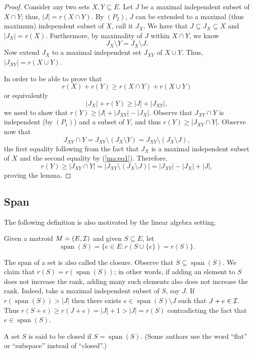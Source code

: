 \documentclass[12pt]{article}
\newcommand{\spa}{\operatorname{span}}
\begin{document}
\begin{proof}
Consider any two sets $X, Y\subseteq E$. Let $J$ be a maximal
independent subset of $X\cap Y$; thus, $|J|=r(X\cap Y)$. By $(P_2)$,
$J$ can be extended to a maximal (thus maximum) independent subset of
$X$, call it $J_X$. We have that $J\subseteq J_X \subseteq X$ and
$|J_X|=r(X)$. Furthermore, by maximality of $J$ within $X\cap Y$, we
know \begin{equation} \label{ma:eq1}
J_X \setminus Y = J_X \setminus J.
\end{equation}
 Now extend $J_X$ to a maximal independent set $J_{XY}$
of $X\cup Y$. Thus, $|J_{XY}|=r(X \cup Y)$. 

In order to be able to
prove that 
$$r(X)+r(Y)\geq r(X\cap Y) + r(X \cup Y)$$
or equivalently
$$|J_X|+r(Y) \geq |J|+|J_{XY}|,$$
we need to show that $r(Y)\geq |J|+|J_{XY}|-|J_X|$. Observe that
$J_{XY}\cap Y$ is independent (by $(P_1)$) and a subset of $Y$, and
thus $r(Y)\geq |J_{XY}\cap Y|$. Observe now 
that $$J_{XY}\cap Y = J_{XY}\setminus (J_X\setminus Y) =J_{XY}\setminus
(J_X\setminus J),$$
the first equality following from the fact that $J_X$ is a maximal
independent subset of $X$ and the second equality by
(\ref{ma:eq1}). Therefore, $$   r(Y)\geq |J_{XY}\cap Y| = |J_{XY}\setminus
(J_X\setminus J)|= |J_{XY}|-|J_X|+|J|,$$ proving the lemma.
\end{proof}

\subsection{Span}
The following definition is also motivated by the linear algebra
setting. 

\begin{definition} \label{def:span}
Given a matroid $M=(E, {\cal I})$ and given $S \subseteq E$,
let $$\spa(S)=\{e\in E: r(S\cup\{e\})=r(S)\}.$$
\end{definition}
The span of a set is also called the closure. Observe that $S\subseteq
\spa(S)$. We claim that $r(S)=r(\spa(S))$; in other words, if adding
an element to $S$ does not increase the rank, adding many such
elements also does not increase the rank. Indeed, take a maximal
independent subset of $S$, say $J$. If $r(\spa(S))>|J|$ then there
exists $e\in \spa(S)\setminus J$ such that $J+e\in {\cal I}$. Thus
$r(S+e)\geq r(J+e)=|J|+1>|J|=r(S)$ contradicting the fact that $e\in
\spa(S)$.

\begin{definition} \label{def:closed}
A set $S$ is said to be closed if $S=\spa(S)$. (Some authors use the word ``flat'' or ``subspace'' instead of ``closed''.)
\end{definition}
\end{document}
